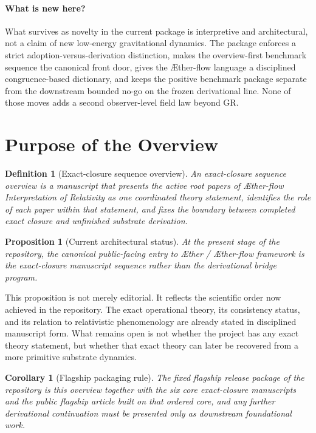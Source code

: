 \documentclass[11pt]{article}
\newcommand{\Aether}{\AE{}ther}
\newcommand{\Aflow}{\AE{}ther-flow}
\newcommand{\TheoryName}{\Aflow{} Interpretation of Relativity}
\newcommand{\TheoryProgram}{\Aether{} / \Aflow{} framework}
\newtheorem{definition}{Definition}
\newtheorem{proposition}{Proposition}
\newtheorem{corollary}{Corollary}
\begin{document}
\paragraph{What is new here?}
What survives as novelty in the current package is interpretive and architectural, not a claim of new low-energy gravitational dynamics. The package enforces a strict adoption-versus-derivation distinction, makes the overview-first benchmark sequence the canonical front door, gives the \Aflow{} language a disciplined congruence-based dictionary, and keeps the positive benchmark package separate from the downstream bounded no-go on the frozen derivational line. None of those moves adds a second observer-level field law beyond GR.



\section{Purpose of the Overview}

\begin{definition}[Exact-closure sequence overview]
An exact-closure sequence overview is a manuscript that presents the active root papers of \TheoryName{} as one coordinated theory statement, identifies the role of each paper within that statement, and fixes the boundary between completed exact closure and unfinished substrate derivation.
\end{definition}

\begin{proposition}[Current architectural status]
At the present stage of the repository, the canonical public-facing entry to \TheoryProgram{} is the exact-closure manuscript sequence rather than the derivational bridge program.
\end{proposition}

This proposition is not merely editorial. It reflects the scientific order now achieved in the repository. The exact operational theory, its consistency status, and its relation to relativistic phenomenology are already stated in disciplined manuscript form. What remains open is not whether the project has any exact theory statement, but whether that exact theory can later be recovered from a more primitive substrate dynamics.

\begin{corollary}[Flagship packaging rule]
The fixed flagship release package of the repository is this overview together with the six core exact-closure manuscripts and the public flagship article built on that ordered core, and any further derivational continuation must be presented only as downstream foundational work.
\end{corollary}
\end{document}
